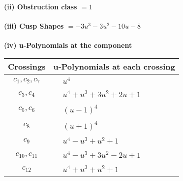 \documentclass[1p]{elsarticle_modified}
\theoremstyle{definition}
\begin{document}
\flushleft \textbf{(ii) Obstruction class $= 1$}\\~\\
\flushleft \textbf{(iii) Cusp Shapes $= -3 u^3-3 u^2-10 u-8$}\\~\\
\newpage\renewcommand{\arraystretch}{1}
\flushleft \textbf{(iv) u-Polynomials at the component}\newline \\
\begin{tabular}{m{50pt}|m{274pt}}
Crossings & \hspace{64pt}u-Polynomials at each crossing \\
\hline $$\begin{aligned}c_{1},c_{2},c_{7}\end{aligned}$$&$\begin{aligned}
&u^4
\end{aligned}$\\
\hline $$\begin{aligned}c_{3},c_{4}\end{aligned}$$&$\begin{aligned}
&u^4+u^3+3 u^2+2 u+1
\end{aligned}$\\
\hline $$\begin{aligned}c_{5},c_{6}\end{aligned}$$&$\begin{aligned}
&(u-1)^4
\end{aligned}$\\
\hline $$\begin{aligned}c_{8}\end{aligned}$$&$\begin{aligned}
&(u+1)^4
\end{aligned}$\\
\hline $$\begin{aligned}c_{9}\end{aligned}$$&$\begin{aligned}
&u^4- u^3+u^2+1
\end{aligned}$\\
\hline $$\begin{aligned}c_{10},c_{11}\end{aligned}$$&$\begin{aligned}
&u^4- u^3+3 u^2-2 u+1
\end{aligned}$\\
\hline $$\begin{aligned}c_{12}\end{aligned}$$&$\begin{aligned}
&u^4+u^3+u^2+1
\end{aligned}$\\
\hline
\end{tabular}\\~\\
\end{document}

